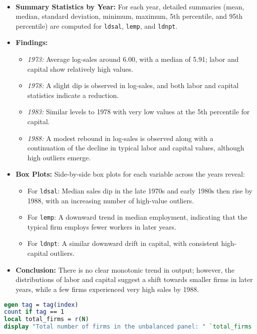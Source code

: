 \documentclass[a4paper,12pt]{article} %
\theoremstyle{nonitalic}
\newenvironment{solution}[1]
  {\renewcommand\theinnercustomsol{#1}\innercustomsol}
  {\endinnercustomsol}
\newcounter{solutionctr}
\renewcommand{\thesolutionctr}{(\alph{solutionctr})}
\newenvironment{autosolution}
  {\stepcounter{solutionctr}\begin{solution}{\thesolutionctr}}
  {\end{solution}}
\begin{document}
\begin{autosolution}
\ 
    
\begin{itemize}
    \item \textbf{Summary Statistics by Year:} For each year, detailed summaries (mean, median, standard deviation, minimum, maximum, 5th percentile, and 95th percentile) are computed for \texttt{ldsal}, \texttt{lemp}, and \texttt{ldnpt}.
    \item \textbf{Findings:}
    \begin{itemize}
        \item \emph{1973:} Average log-sales around 6.00, with a median of 5.91; labor and capital show relatively high values.
        \item \emph{1978:} A slight dip is observed in log-sales, and both labor and capital statistics indicate a reduction.
        \item \emph{1983:} Similar levels to 1978 with very low values at the 5th percentile for capital.
        \item \emph{1988:} A modest rebound in log-sales is observed along with a continuation of the decline in typical labor and capital values, although high outliers emerge.
    \end{itemize}
    \item \textbf{Box Plots:} Side-by-side box plots for each variable across the years reveal:
    \begin{itemize}
        \item For \texttt{ldsal}: Median sales dip in the late 1970s and early 1980s then rise by 1988, with an increasing number of high-value outliers.
        \item For \texttt{lemp}: A downward trend in median employment, indicating that the typical firm employs fewer workers in later years.
        \item For \texttt{ldnpt}: A similar downward drift in capital, with consistent high-capital outliers.
    \end{itemize}
    \item \textbf{Conclusion:} There is no clear monotonic trend in output; however, the distributions of labor and capital suggest a shift towards smaller firms in later years, while a few firms experienced very high sales by 1988.
\end{itemize}

\begin{lstlisting}[language=stata]
egen tag = tag(index)
count if tag == 1
local total_firms = r(N)
display "Total number of firms in the unbalanced panel: " `total_firms'
    

\end{lstlisting}
\end{autosolution}
\end{document}
